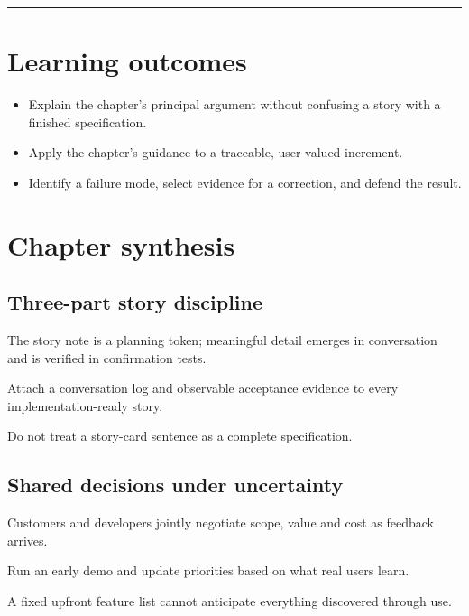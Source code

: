 \documentclass[11pt,letterpaper]{article}
\begin{document}
\tableofcontents\medskip\noindent\rule{\linewidth}{0.4pt}\medskip
\section{Learning outcomes}
\begin{itemize}[leftmargin=*,itemsep=2pt]
\item Explain the chapter's principal argument without confusing a story with a finished specification.
\item Apply the chapter's guidance to a traceable, user-valued increment.
\item Identify a failure mode, select evidence for a correction, and defend the result.
\end{itemize}
\section{Chapter synthesis}
\subsection{Three-part story discipline}
The story note is a planning token; meaningful detail emerges in conversation and is verified in confirmation tests.

\begin{tcolorbox}[colback=tealback,colframe=navy,title={Engineering translation},breakable]
Attach a conversation log and observable acceptance evidence to every implementation-ready story.

\end{tcolorbox}
\begin{tcolorbox}[colback=amberback,colframe=navy,title={Failure mode to watch},breakable]
Do not treat a story-card sentence as a complete specification.

\end{tcolorbox}
\subsection{Shared decisions under uncertainty}
Customers and developers jointly negotiate scope, value and cost as feedback arrives.

\begin{tcolorbox}[colback=tealback,colframe=navy,title={Engineering translation},breakable]
Run an early demo and update priorities based on what real users learn.

\end{tcolorbox}
\begin{tcolorbox}[colback=amberback,colframe=navy,title={Failure mode to watch},breakable]
A fixed upfront feature list cannot anticipate everything discovered through use.

\end{tcolorbox}
\end{document}
